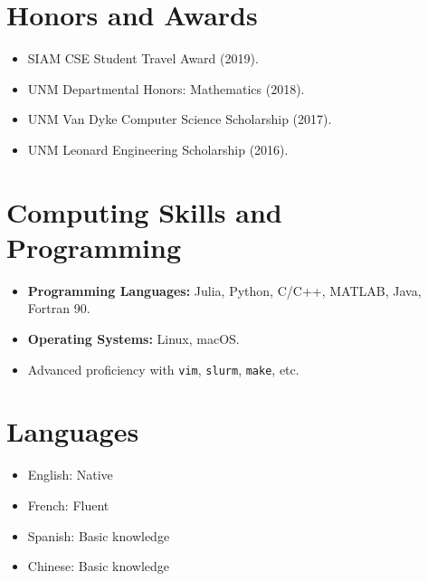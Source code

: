 \documentclass[11pt,a4paper,sans]{moderncv}
\begin{document}
\section{Honors and Awards}
\begin{itemize}
  \item SIAM CSE Student Travel Award (2019).
  \item UNM Departmental Honors: Mathematics (2018).
  \item UNM Van Dyke Computer Science Scholarship (2017).
  \item UNM Leonard Engineering Scholarship (2016).
\end{itemize}

\section{Computing Skills and Programming}
\begin{itemize}
  \item \textbf{Programming Languages:} Julia, Python, C/C++, MATLAB, Java, Fortran 90.
  \item \textbf{Operating Systems:} Linux, macOS.
  \item Advanced proficiency with \texttt{vim}, \texttt{slurm}, \texttt{make}, etc.
\end{itemize}

\section{Languages}
\begin{itemize}
  \item English: Native
  \item French: Fluent
  \item Spanish: Basic knowledge
  \item Chinese: Basic knowledge
\end{itemize}
\end{document}
